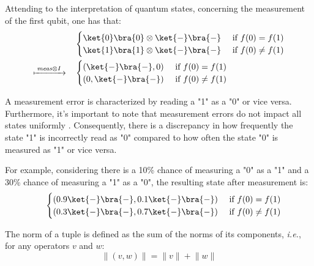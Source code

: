   Attending to the interpretation of quantum states, concerning the measurement of the first qubit, one has that:
  \begin{equation}
  \begin{split}
    \quad &
    \begin{cases}
      \ket{0} \bra{0} \otimes \ket{-} \bra{-}  &\text{ if }   f(0)= f(1) \\
      \ket{1} \bra{1} \otimes \ket{-} \bra{-} &\text{ if }   f(0) \neq f(1)
    \end{cases} \\
    \xmapsto{ \hspace{2pt} \textit{meas} \otimes I \hspace{2pt}} \quad &
    \begin{cases}
     (\ket{-} \bra{-},0)  &\text{ if }   f(0)= f(1) \\
     (0,\ket{-} \bra{-}) &\text{ if }   f(0) \neq f(1) 
    \end{cases} \\
  \end {split}
  \end{equation} 
  
  
  A measurement error is characterized by reading a "1" as a "0" or vice versa. Furthermore, it's important to note that measurement errors do not impact all states uniformly \cite{tannu2019mitigating}. Consequently, there is a discrepancy in how frequently the state "1" is incorrectly read as "0" compared to how often the state "0" is measured as "1" or vice versa.
  
  For example, considering there is a 10\% chance of measuring a "0" as a "1" and a 30\% chance of measuring a "1" as a "0", the resulting state after measurement is:
  \begin{equation}
  \begin{split}
    \quad &
    \begin{cases}
     (0.9\ket{-} \bra{-},0.1\ket{-} \bra{-})  &\text{ if }   f(0)= f(1) \\
     (0.3\ket{-} \bra{-}, 0.7\ket{-} \bra{-}) &\text{ if }   f(0) \neq f(1) 
    \end{cases} \\
  \end {split}
  \end{equation}
  
  The norm of a tuple is defined as the sum of the norms of its components, \textit{i.e.}, for any operators $v$ and $w$:
  \begin{equation} \label{eq:norm_tuple}
    \lVert (v,w) \rVert = \lVert v \rVert + \lVert w \rVert
  \end{equation}
  
